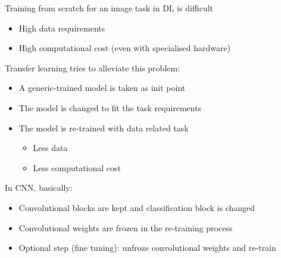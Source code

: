Training from scratch for an image task in DL is difficult
\begin{itemize}
	\item High data requirements
	\item High computational cost (even with specialised hardware)
\end{itemize}
Transfer learning tries to alleviate this problem:
\begin{itemize}
	\item A generic-trained model is taken as init point
	\item The model is changed to fit the task requirements
	\item The model is re-trained with data related task
   \begin{itemize}
   	\item Less data
	   \item Less computational cost
   \end{itemize}
\end{itemize}
In CNN, basically:
\begin{itemize}
	\item Convolutional blocks are kept and classification block is changed
	\item Convolutional weights are frozen in the re-training process
	\item Optional step (fine tuning): unfroze convolutional weights and re-train
\end{itemize}

